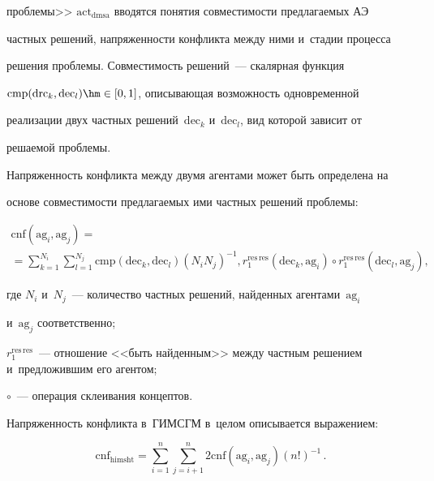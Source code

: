 проблемы>> $\mathrm{act}_{\mathrm{dmsa}}$ вводятся понятия совместимости предлагаемых АЭ 


частных решений, напряженности конфликта между ними и~стадии процесса 


решения проблемы. Совместимость решений~--- скалярная функция 


$\mathrm{cmp}(\mathrm{drc}_k, \mathrm{dec}_l)\hm\in [0,1]$, описывающая возможность одновременной 


реализации двух частных решений~$\mathrm{dec}_k$ и~$\mathrm{dec}_l$, вид которой зависит от 


решаемой проб\-лемы. 


  


  Напряженность конфликта между двумя агентами может быть определена на 


основе совместимости предлагаемых ими частных решений проблемы:


  \begin{multline}


  \mathrm{cnf}(\mathrm{ag}_i, \mathrm{ag}_j) ={}\\


  {}=\sum\limits_{k=1}^{N_i} \sum\limits_{l=1}^{N_j} \mathrm{cmp}\left( 


\mathrm{dec}_k, \mathrm{dec}_l\right) \left( N_i N_j\right)^{-1},


  r_1^{\mathrm{res\,res}}\left( \mathrm{dec}_k, \mathrm{ag}_i\right)\circ 


  r_1^{\mathrm{res\,res}}\left( \mathrm{dec}_l,\mathrm{ag}_j\right),\!\!


  \label{e1-kl}


  \end{multline}


    где $N_i$ и~$N_j$~--- количество частных решений, найденных агентами~$\mathrm{ag}_i$ 


    и~$\mathrm{ag}_j$ соответственно; 


$r_1^{\mathrm{res\,res}}$~--- отношение <<быть найденным>> между частным решением и~предложившим его агентом; 


$\circ$~--- операция склеивания концептов.


  


  Напряженность конфликта в~ГИМСГМ в~целом описывается выражением:


  \begin{equation}


  \mathrm{cnf}_{\mathrm{himsht}}=\sum\limits^n_{i=1} \sum\limits^n_{j=i+1} 


  2\mathrm{cnf} \left( \mathrm{ag}_i,  \mathrm{ag}_j\right) (n!)^{-1}\,.


  \label{e2-kl}


  \end{equation}


